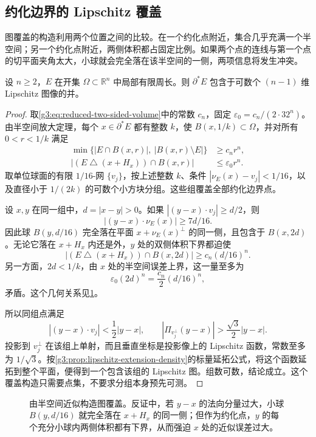 \subsection{约化边界的 Lipschitz 覆盖}
\label{g3:subsec:2104:05}
图覆盖的构造利用两个位置之间的比较。在一个约化点附近，集合几乎充满一个半空间；另一个约化点附近，两侧体积都占固定比例。如果两个点的连线与第一个点的切平面夹角太大，小球就会完全落在该半空间的一侧，两项信息将发生冲突。

\begin{proposition}\label{g3:prop:reduced-boundary-lipschitz-cover}
	设 \(n\ge2\)，\(E\) 在开集 \(\Omega\subset\mathbb R^n\) 中局部有限周长。则 \(\partial^*E\) 包含于可数个 \((n-1)\) 维 Lipschitz 图像的并。
\end{proposition}
\begin{proof}
	取\eqref{g3:eq:reduced-two-sided-volume}中的常数 \(c_n\)，固定
	\(\varepsilon_0=c_n/(2\cdot32^n)\)。由半空间放大定理，每个 \(x\in\partial^*E\) 都有整数 \(k\)，使 \(B(x,1/k)\subset\Omega\)，并对所有 \(0<r<1/k\) 满足
	\begin{align*}
		\min\{|E\cap B(x,r)|,\ |B(x,r)\setminus E|\}&\ge c_nr^n,\\
		|(E\mathbin{\triangle}(x+H_x))\cap B(x,r)|&\le\varepsilon_0r^n.
	\end{align*}
	取单位球面的有限 \(1/16\)-网 \(\{v_j\}\)，按上述整数 \(k\)、条件 \(|\nu_E(x)-v_j|<1/16\)，以及直径小于 \(1/(2k)\) 的可数个小方块分组。这些组覆盖全部约化边界点。

	设 \(x,y\) 在同一组中，\(d=|x-y|>0\)。如果
	\(|(y-x)\cdot v_j|\ge d/2\)，则
	\[
		|(y-x)\cdot\nu_E(x)|\ge7d/16.
	\]
	因此球 \(B(y,d/16)\) 完全落在平面 \(x+\nu_E(x)^\perp\) 的同一侧，且包含于 \(B(x,2d)\)。无论它落在 \(x+H_x\) 内还是外，\(y\) 处的双侧体积下界都迫使
	\[
		|(E\mathbin{\triangle}(x+H_x))\cap B(x,2d)|
		\ge c_n(d/16)^n.
	\]
	另一方面，\(2d<1/k\)，由 \(x\) 处的半空间误差上界，这一量至多为
	\[
		\varepsilon_0(2d)^n=\frac{c_n}{2}(d/16)^n,
	\]
	矛盾。这个几何关系见\cref{g3:fig:reduced-boundary-graph}。

	所以同组点满足
	\[
		|(y-x)\cdot v_j|<\frac12|y-x|,
		\qquad
		|\Pi_{v_j^\perp}(y-x)|>\frac{\sqrt3}{2}|y-x|.
	\]
	投影到 \(v_j^\perp\) 在该组上单射，而且垂直坐标是投影像上的 Lipschitz 函数，常数至多为 \(1/\sqrt3\)。按\cref{g3:prop:lipschitz-extension-density}的标量延拓公式，将这个函数延拓到整个平面，便得到一个包含该组的 Lipschitz 图。组数可数，结论成立。这个覆盖构造只需要点集，不要求分组本身预先可测。
\end{proof}

\begin{figure}[htbp]
	\centering
	
	\caption[由半空间近似构造图覆盖]{由半空间近似构造图覆盖。反证中，若 \(y-x\) 的法向分量过大，小球 \(B(y,d/16)\) 就完全落在 \(x+H_x\) 的同一侧；但作为约化点，\(y\) 的每个充分小球内两侧体积都有下界，从而强迫 \(x\) 处的近似误差过大。}
	\label{g3:fig:reduced-boundary-graph}
\end{figure}

